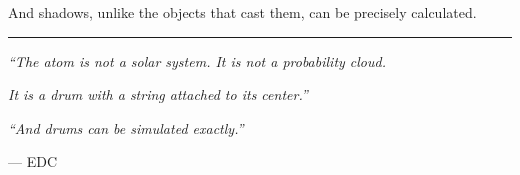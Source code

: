 And shadows, unlike the objects that cast them, can be precisely calculated.

\vspace{2em}
\begin{center}
\rule{0.5\textwidth}{0.4pt}

\textit{``The atom is not a solar system. It is not a probability cloud.}

\textit{It is a drum with a string attached to its center.''}

\vspace{1em}

\textit{``And drums can be simulated exactly.''}

--- EDC
\end{center}

